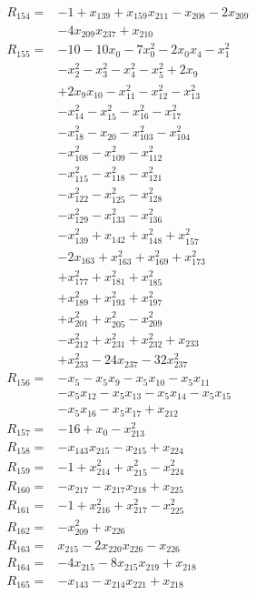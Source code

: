 \begin{align*}
R_{154}={}&-1 +x_{139} +x_{159}x_{211} -x_{208} -2x_{209}\\
&-4x_{209}x_{237} +x_{210}\\[3pt]
R_{155}={}&-10 -10x_{0} -7x_{0}^{2} -2x_{0}x_{4} -x_{1}^{2}\\
&-x_{2}^{2} -x_{3}^{2} -x_{4}^{2} -x_{5}^{2} +2x_{9}\\
&+2x_{9}x_{10} -x_{11}^{2} -x_{12}^{2} -x_{13}^{2}\\
&-x_{14}^{2} -x_{15}^{2} -x_{16}^{2} -x_{17}^{2}\\
&-x_{18}^{2} -x_{20} -x_{103}^{2} -x_{104}^{2}\\
&-x_{108}^{2} -x_{109}^{2} -x_{112}^{2}\\
&-x_{115}^{2} -x_{118}^{2} -x_{121}^{2}\\
&-x_{122}^{2} -x_{125}^{2} -x_{128}^{2}\\
&-x_{129}^{2} -x_{133}^{2} -x_{136}^{2}\\
&-x_{139}^{2} +x_{142} +x_{148}^{2} +x_{157}^{2}\\
&-2x_{163} +x_{163}^{2} +x_{169}^{2} +x_{173}^{2}\\
&+x_{177}^{2} +x_{181}^{2} +x_{185}^{2}\\
&+x_{189}^{2} +x_{193}^{2} +x_{197}^{2}\\
&+x_{201}^{2} +x_{205}^{2} -x_{209}^{2}\\
&-x_{212}^{2} +x_{231}^{2} +x_{232}^{2} +x_{233}\\
&+x_{233}^{2} -24x_{237} -32x_{237}^{2}\\[3pt]
R_{156}={}&-x_{5} -x_{5}x_{9} -x_{5}x_{10} -x_{5}x_{11}\\
&-x_{5}x_{12} -x_{5}x_{13} -x_{5}x_{14} -x_{5}x_{15}\\
&-x_{5}x_{16} -x_{5}x_{17} +x_{212}\\[3pt]
R_{157}={}&-16 +x_{0} -x_{213}^{2}\\[3pt]
R_{158}={}&-x_{143}x_{215} -x_{215} +x_{224}\\[3pt]
R_{159}={}&-1 +x_{214}^{2} +x_{215}^{2} -x_{224}^{2}\\[3pt]
R_{160}={}&-x_{217} -x_{217}x_{218} +x_{225}\\[3pt]
R_{161}={}&-1 +x_{216}^{2} +x_{217}^{2} -x_{225}^{2}\\[3pt]
R_{162}={}&-x_{209}^{2} +x_{226}\\[3pt]
R_{163}={}&x_{215} -2x_{220}x_{226} -x_{226}\\[3pt]
R_{164}={}&-4x_{215} -8x_{215}x_{219} +x_{218}\\[3pt]
R_{165}={}&-x_{143} -x_{214}x_{221} +x_{218}\\[3pt]

\end{align*}
